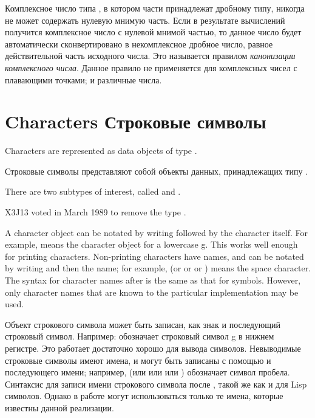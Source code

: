 Комплексное число типа , в котором части принадлежат
дробному типу, никогда не может содержать нулевую мнимую часть. Если в
результате вычислений получится комплексное число с нулевой мнимой частью, то
данное число будет автоматически сконвертировано в некомплексное дробное число,
равное действительной часть исходного числа. Это называется правилом {\it
 канонизации комплексного числа}. Данное правило не применяется для комплексных
чисел с плавающими точками;  и  различные числа.

\goodbreak

\section{Characters Строковые символы}

Characters are represented as data objects of type .

Строковые символы представляют собой объекты данных, принадлежащих типу
.
\begin{obsolete}
There are two subtypes of interest,
called  and .
\end{obsolete}
\begin{newer}
X3J13 voted in March 1989  to remove the type .
\end{newer}

A character object can be notated by writing \cd{\#{\Xbackslash}} followed
by the character itself.  For example,  means the character
object for a lowercase g.  This works well enough for printing
characters.  Non-printing characters have names, and can be notated
by writing \cd{\#{\Xbackslash}} and then the name; for example, 
(or  or  or )
means the space character.  The syntax for character names after \cd{\#{\Xbackslash}}
is the same as that for symbols.  However, only character names
that are known to the particular implementation may be used.

Объект строкового символа может быть записан, как знак \cd{\#{\Xbackslash}} и последующий строковый символ. Например:  
обозначает строковый символ g в нижнем регистре. Это работает достаточно хорошо
для вывода символов. Невыводимые строковые символы имеют имена, и могут быть
записаны с помощью \cd{\#{\Xbackslash}} и последующего имени; например,
 (или  или
 или ) обозначает символ пробела.
Синтаксис для записи имени строкового символа после \cd{\#{\Xbackslash}}, такой
же как и для Lisp символов. Однако в работе могут использоваться только те
имена, которые известны данной реализации.

